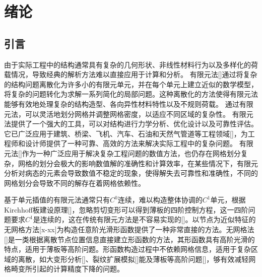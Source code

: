 \chapter{绪论}
\section{引言}
由于实际工程中的结构通常具有复杂的几何形状、非线性材料行为以及多样化的荷载情况，导致经典的解析方法难以直接应用于计算和分析。
有限元法[]通过将复杂的结构问题离散化为许多小的有限元单元，并在每个单元上建立近似的数学模型，将复杂的问题转化为求解一系列简化的局部问题。这种离散化的方法使得有限元法能够有效地处理复杂的结构造型、各向异性材料特性以及不规则荷载。
通过有限元法，可以灵活地划分网格并调整网格密度，以适应不同区域的复杂性。
有限元法提供了一个强大的工具，可以对结构进行力学分析、优化设计以及可靠性评估。它已广泛应用于建筑、桥梁、飞机、汽车、石油和天然气管道等工程领域[]，为工程师和设计师提供了一种可靠、高效的方法来解决实际工程中的复杂问题。
有限元法[]作为一种广泛应用于解决复杂工程问题的数值方法，也仍存在网格划分复杂，网格的划分会极大的影响数值解的准确性和计算效率，在某些情况下，有限元分析对病态的元素会导致数值不稳定的现象，使得解失去可靠性和准确性，不同的网格划分会导致不同的解存在着网格依赖性。\par
基于单元插值的有限元法通常只有$C^0$连续，难以构造整体协调的$C^1$单元，根据Kirchhoff板建设原理[]，忽略剪切变形可以得到薄板的四阶控制方程，这一四阶问题要求$C^1$是连续的，这在传统有限元方法是不容易实现的[]。以节点为近似特征的无网格方法[x-xx]为构造任意阶光滑形函数提供了一种非常直接的方法。无网格法[]是一类根据离散节点位置信息直接建立形函数的方法，其形函数具有高阶光滑的特点，适用于薄板等高阶问题。形函数构造过程中不依赖网格信息，适用于复杂区域的离散，如大变形分析[]、裂纹扩展模拟[]能及薄板等高阶问题[]，够有效减轻网格畸变所引起的计算精度下降的问题。
